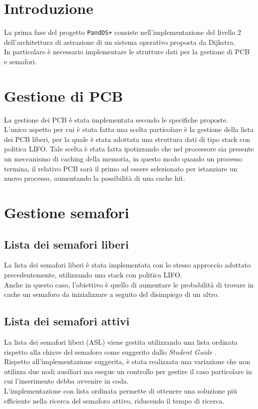 \documentclass[11pt]{article}
\begin{document}
\newpage

\section{Introduzione}
La prima fase del progetto \texttt{PandOS+} consiste nell'implementazione del livello 2 dell'architettura di astrazione di un sistema operativo proposta da Dijkstra.\\
In particolare è necessario implementare le strutture dati per la gestione di PCB e semafori.

\section{Gestione di PCB}
La gestione dei PCB è stata implementata secondo le specifiche proposte. \\
L'unico aspetto per cui è stata fatta una scelta particolare è la gestione della lista dei PCB liberi, per la quale è stata adottata una struttura dati di tipo stack con politica LIFO.
Tale scelta è stata fatta ipotizzando che nel processore sia presente un meccanismo di caching della memoria, in questo modo quando un processo termina, 
il relativo PCB sarà il primo ad essere selezionato per istanziare un nuovo processo, aumentando la possibilità di una cache hit.

\section{Gestione semafori}
\subsection{Lista dei semafori liberi}
La lista dei semafori liberi è stata implementata con lo stesso approccio adottato precedentemente, utilizzando una stack con politica LIFO. \\
Anche in questo caso, l'obiettivo è quello di aumentare le probabilità di trovare in cache un semaforo da inizializzare a seguito del disimpiego di un altro.

\subsection{Lista dei semafori attivi}
La lista dei semafori liberi (ASL) viene gestita utilizzando una lista ordinata rispetto alla chiave del semaforo come suggerito dallo \textit{Student Guide} \cite{1}. \\
Rispetto all'implementazione suggerita, è stata realizzata una variazione che non utilizza due nodi ausiliari ma esegue un controllo per gestire il caso particolare in cui l'inserimento debba avvenire in coda.\\
L'implementazione con lista ordinata permette di ottenere una soluzione più efficiente nella ricerca del semaforo attivo, riducendo il tempo di ricerca.

\newpage
\printbibliography[title={Bibliografia}]
\end{document}
